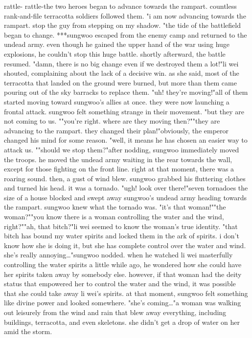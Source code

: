 rattle- rattle-the two heroes began to advance towards the rampart.
 countless rank-and-file terracotta soldiers followed them.
"i am now advancing towards the rampart.
 stop the guy from stepping on my shadow.
"the tide of the battlefield began to change.
***sungwoo escaped from the enemy camp and returned to the undead army.
even though he gained the upper hand of the war using huge explosions, he couldn't stop this huge battle.
 shortly afterward, the battle resumed.
"damn, there is no big change even if we destroyed them a lot!"li wei shouted, complaining about the lack of a decisive win.
as she said, most of the terracotta that landed on the ground were burned, but more than them came pouring out of the sky barracks to replace them.
"uh! they're moving!"all of them started moving toward sungwoo's allies at once.
 they were now launching a frontal attack.
 sungwoo felt something strange in their movement.
"but they are not coming to us.
""you're right.
 where are they moving then?""they are advancing to the rampart.
 they changed their plan!"obviously, the emperor changed his mind for some reason.
"well, it means he has chosen an easier way to attack us.
""should we stop them?"after nodding, sungwoo immediately moved the troops.
 he moved the undead army waiting in the rear towards the wall, except for those fighting on the front line.
right at that moment, there was a roaring sound.
 then, a gust of wind blew.
sungwoo grabbed his fluttering clothes and turned his head.
 it was a tornado.
"ugh! look over there!"seven tornadoes the size of a house blocked and swept away sungwoo's undead army heading towards the rampart.
 sungwoo knew what the tornado was.
"it's that woman!""the woman?""you know there is a woman controlling the water and the wind, right?""ah, that bitch?"li wei seemed to know the woman's true identity.
"that bitch has bound my water spirits and locked them in the ark of spirits.
 i don't know how she is doing it, but she has complete control over the water and wind.
 she's really annoying…"sungwoo nodded.
 when he watched li wei masterfully controlling the water spirits a little while ago, he wondered how she could have her spirits taken away by somebody else.
however, if that woman had the deity status that empowered her to control the water and the wind, it was possible that she could take away li wei's spirits.
at that moment, sungwoo felt something like divine power and looked somewhere.
"she's coming…"a woman was walking out leisurely from the wind and rain that blew away everything, including buildings, terracotta, and even skeletons.
 she didn't get a drop of water on her amid the storm.


